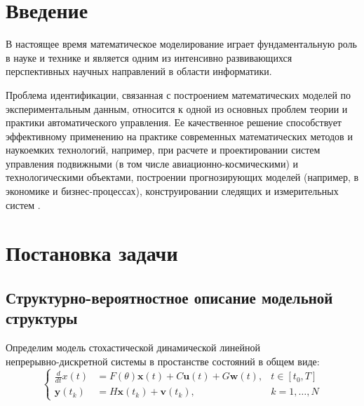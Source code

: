 \documentclass[a4paper,14pt]{extarticle}
\begin{document}
\tableofcontents

\newpage

\section*{Введение}

В настоящее время математическое моделирование играет фундаментальную роль в
науке и технике и является одним из интенсивно развивающихся перспективных
научных направлений в области информатики.

Проблема идентификации, связанная с построением математических моделей по
экспериментальным данным, относится к одной из основных проблем теории и
практики автоматического управления. Ее качественное решение способствует
эффективному применению на практике современных математических методов и
наукоемких технологий, например, при расчете и проектировании систем управления
подвижными (в том числе авиационно-космическими) и технологическими объектами,
построении прогнозирующих моделей (например, в экономике и бизнес-процессах),
конструировании следящих и измерительных систем \cite{denisov}.

\section{Постановка задачи}

\subsection[Структурно-вероятностное описание модельной структуры]
{Структурно-вероятностное описание модельной \\структуры}

\renewcommand{\vec}[1]{\mathbf{#1}}

Определим модель стохастической динамической линейной \\непрерывно-дискретной
системы в простанстве состояний в общем виде:
\begin{equation}
	\label{eq:initmod}
	\left\{ 
		\begin{array}{lll}
			\frac{d}{dt}x(t) &= F(\theta) \vec{x}(t) + C \vec{u}(t) + G \vec{w}(t),
				& t \in [t_0,T] \\ 
			\vec{y}(t_k)           &= H \vec{x}(t_k) + \vec{v}(t_k), 
				& k = 1,\ldots, N
		\end{array} 
	\right. 
\end{equation}
\end{document}
